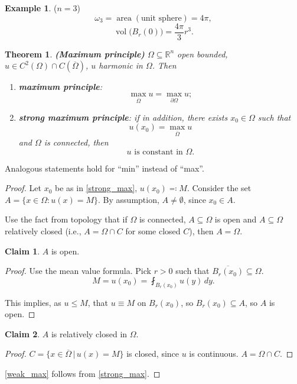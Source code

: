 \documentclass[12pt]{article}
\DeclareMathOperator{\area}{area}
\DeclareMathOperator{\vol}{vol}
\newtheorem{theorem}{Theorem}[section]
\theoremstyle{definition}
\newtheorem{claim}{Claim}
\newtheorem*{example*}{Example}
\begin{document}
\begin{example*}
($n=3$)
\[\omega_3=\area(\text{unit sphere})=4\pi,\]
\[\vol\big(B_r(0)\big)=\frac{4\pi}3r^3.\]
\end{example*}

\begin{theorem}
\emph{\textbf{(Maximum principle)}} $\Omega\subseteq\mathbb R^n$ open bounded, $u\in C^2(\Omega)\cap C(\overline\Omega)$, $u$ harmonic in $\Omega$. Then
\begin{enumerate}[label=(\roman*)]
\item\label{weak_max} \emph{\textbf{maximum principle}}:
\[\max_{\overline\Omega}u=\max_{\partial\Omega}u;\]
\item\label{strong_max} \emph{\textbf{strong maximum principle}}: if in addition, there exists $x_0\in\Omega$ such that
\[u(x_0)=\max_{\overline\Omega}u\]
and $\Omega$ is connected, then
\[u\text{ is constant in }\Omega.\]
\end{enumerate}
\end{theorem}

Analogous statements hold for ``min'' instead of ``max''.

\begin{proof}
Let $x_0$ be as in \ref{strong_max}, $u(x_0)\eqqcolon M$. Consider the set $A=\{x\in\Omega:u(x)=M\}$. By assumption, $A\neq\emptyset$, since $x_0\in A$.

Use the fact from topology that if $\Omega$ is connected, $A\subseteq\Omega$ is open and $A\subseteq\Omega$ relatively closed (i.e., $A=\Omega\cap C$ for some closed $C$), then $A=\Omega$.

\begin{claim}
$A$ is open.
\end{claim}

\begin{proof}
Use the mean value formula. Pick $r>0$ such that $\overline{B_r(x_0)}\subseteq\Omega$.
\[M=u(x_0)=\fint_{B_r(x_0)}u(y)\,dy.\]

This implies, as $u\leq M$, that $u\equiv M$ on $B_r(x_0)$, so $B_r(x_0)\subseteq A$, so $A$ is open.
\end{proof}

\begin{claim}
$A$ is relatively closed in $\Omega$.
\end{claim}

\begin{proof}
$C=\{x\in\overline\Omega\,|\,u(x)=M\}$ is closed, since $u$ is continuous. $A=\Omega\cap C$.
\end{proof}

\ref{weak_max} follows from \ref{strong_max}.
\end{proof}
\end{document}
